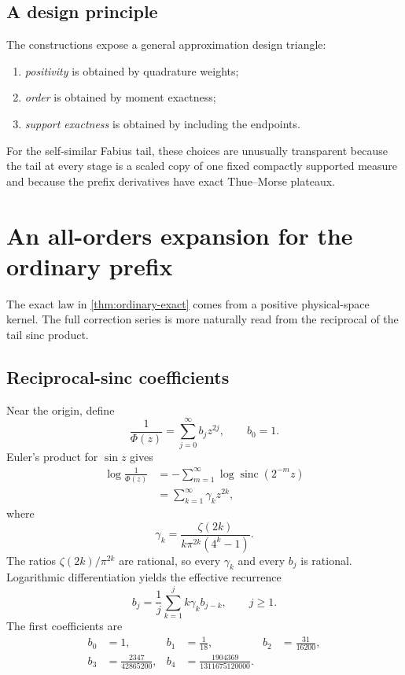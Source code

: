 \documentclass[11pt]{article}
\numberwithin{equation}{section}
\theoremstyle{definition}
\theoremstyle{remark}
\newcommand{\sinc}{\operatorname{sinc}}
\begin{document}
\subsection{A design principle}

The constructions expose a general approximation design triangle:
\begin{enumerate}
\item \emph{positivity} is obtained by quadrature weights;
\item \emph{order} is obtained by moment exactness;
\item \emph{support exactness} is obtained by including the endpoints.
\end{enumerate}
For the self-similar Fabius tail, these choices are unusually transparent because the tail at every stage is a scaled copy of one fixed compactly supported measure and because the prefix derivatives have exact Thue--Morse plateaux.

\section{An all-orders expansion for the ordinary prefix}
\label{sec:reciprocal-sinc}

The exact law in \cref{thm:ordinary-exact} comes from a positive physical-space kernel.  The full correction series is more naturally read from the reciprocal of the tail sinc product.

\subsection{Reciprocal-sinc coefficients}

Near the origin, define
\begin{equation}
 \frac1{\Phi(z)}=\sum_{j=0}^{\infty}b_jz^{2j},
 \qquad b_0=1.
 \label{eq:B-reciprocal}
\end{equation}
Euler's product for $\sin z$ gives
\begin{align}
 \log\frac1{\Phi(z)}
 &=-\sum_{m=1}^{\infty}\log\sinc(2^{-m}z)\nonumber\\
 &=\sum_{k=1}^{\infty}\gamma_kz^{2k},
 \label{eq:log-reciprocal-Phi}
\end{align}
where
\begin{equation}
 \boxed{
 \gamma_k=\frac{\zeta(2k)}{k\pi^{2k}(4^k-1)}.}
 \label{eq:gamma-k}
\end{equation}
The ratios $\zeta(2k)/\pi^{2k}$ are rational, so every $\gamma_k$ and every $b_j$ is rational.  Logarithmic differentiation yields the effective recurrence
\begin{equation}
 \boxed{
 b_j=\frac1j\sum_{k=1}^{j}k\gamma_kb_{j-k},
 \qquad j\ge1.}
 \label{eq:b-recurrence}
\end{equation}
The first coefficients are
\begin{align}
 b_0&=1,&
 b_1&=\frac1{18},&
 b_2&=\frac{31}{16200},\label{eq:b-low-1}\\
 b_3&=\frac{2347}{42865200},&
 b_4&=\frac{1904369}{1311675120000}.\label{eq:b-low-2}
\end{align}
\end{document}
